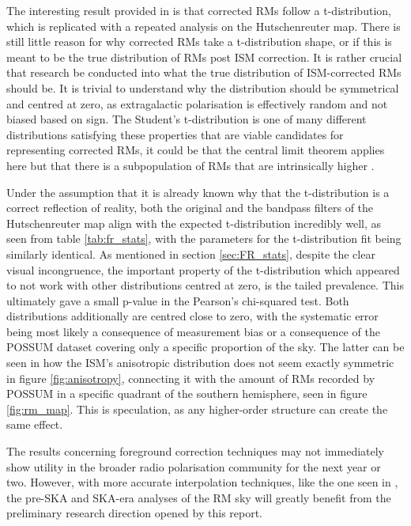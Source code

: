 The interesting result provided in \cite{ID73} is that corrected RMs follow a t-distribution, which is replicated with a repeated analysis on the Hutschenreuter map. There is still little reason for why corrected RMs take a t-distribution shape, or if this is meant to be the true distribution of RMs post ISM correction. It is rather crucial that research be conducted into what the true distribution of ISM-corrected RMs should be. It is trivial to understand why the distribution should be symmetrical and centred at zero, as extragalactic polarisation is effectively random and not biased based on sign. The Student's t-distribution is one of many different distributions satisfying these properties that are viable candidates for representing corrected RMs, it could be that the central limit theorem applies here but that there is a subpopulation of RMs that are intrinsically higher \citep{ID1}.


Under the assumption that it is already known why that the t-distribution is a correct reflection of reality, both the original and the bandpass filters of the Hutschenreuter map align with the expected t-distribution incredibly well, as seen from table \ref{tab:fr_stats}, with the parameters for the t-distribution fit being similarly identical. As mentioned in section \ref{sec:FR_stats}, despite the clear visual incongruence, the important property of the t-distribution which appeared to not work with other distributions centred at zero, is the tailed prevalence. This ultimately gave a small p-value in the Pearson's chi-squared test. Both distributions additionally are centred close to zero, with the systematic error being most likely a consequence of measurement bias or a consequence of the POSSUM dataset covering only a specific proportion of the sky. The latter can be seen in how the ISM's anisotropic distribution does not seem exactly symmetric in figure \ref{fig:anisotropy}, connecting it with the amount of RMs recorded by POSSUM in a specific quadrant of the southern hemisphere, seen in figure \ref{fig:rm_map}. This is speculation, as any higher-order structure can create the same effect.


The results concerning foreground correction techniques may not immediately show utility in the broader radio polarisation community for the next year or two. However, with more accurate interpolation techniques, like the one seen in \cite{ID58}, the pre-SKA and SKA-era analyses of the RM sky will greatly benefit from the preliminary research direction opened by this report.

